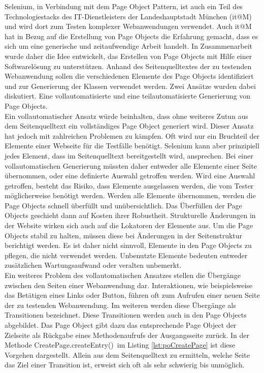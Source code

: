 Selenium, in Verbindung mit dem Page Object Pattern, ist auch ein Teil des Technologiestacks des IT-Dienstleisters der Landeshauptstadt München (it@M) und wird dort zum Testen komplexer Webanwendungen verwendet. Auch it@M hat in Bezug auf die Erstellung von Page Objects die Erfahrung gemacht, dass es sich um eine generische und zeitaufwendige Arbeit handelt.
In Zusammenarbeit wurde daher die Idee entwickelt, das Erstellen von Page Objects mit Hilfe einer Softwarelösung zu unterstützen.
Anhand des Seitenquelltextes der zu testenden Webanwendung sollen die verschiedenen Elemente des Page Objects identifiziert und zur Generierung der Klassen verwendet werden.
Zwei Ansätze wurden dabei diskutiert. Eine vollautomatisierte und eine teilautomatisierte Generierung von Page Objects.\\
Ein vollautomatischer Ansatz würde beinhalten, dass ohne weiteres Zutun aus dem Seitenquelltext ein vollständiges Page Object generiert wird. Dieser Ansatz hat jedoch mit zahlreichen Problemen zu kämpfen. Oft wird nur ein Bruchteil der Elemente einer Webseite für die Testfälle benötigt. Selenium kann aber prinzipiell jedes Element, dass im Seitenquelltext bereitgestellt wird, ansprechen. Bei einer vollautomatischen Generierung müssten daher entweder alle Elemente einer Seite übernommen, oder eine definierte Auswahl getroffen werden.
Wird eine Auswahl getroffen, besteht das Risiko, dass Elemente ausgelassen werden, die vom Tester möglicherweise benötigt werden. Werden alle Elemente übernommen, werden die Page Objects schnell überfüllt und unübersichtlich. Das Überfüllen der Page Objects geschieht dann auf Kosten ihrer Robustheit. Strukturelle Änderungen in der Website wirken sich auch auf die Lokatoren der Elemente aus. Um die Page Objects stabil zu halten, müssen diese bei Änderungen in der Seitenstruktur berichtigt werden.
Es ist daher nicht sinnvoll, Elemente in den Page Objects zu pflegen, die nicht verwendet werden. Unbenutzte Elemente bedeuten entweder zusätzlichen Wartungsaufwand oder veralten unbemerkt.\\
Ein weiteres Problem des vollautomatischen Ansatzes stellen die Übergänge zwischen den Seiten einer Webanwendung dar. Interaktionen, wie beispielsweise das Betätigen eines Links oder Button, führen oft zum Aufrufen einer neuen Seite der zu testenden Webanwendung. Im weiteren werden diese Übergänge als Transitionen bezeichnet. Diese Transitionen werden auch in den Page Objects abgebildet. Das Page Object gibt dazu das entsprechende Page Object der Zielseite als Rückgabe eines Methodenaufrufs der Ausgangsseite zurück. In der Methode \grq CreatePage.createEntry()\grq\ im Listing \ref{lst:poCreatePage} ist diese Vorgehen dargestellt. Allein aus dem Seitenquelltext zu ermitteln, welche Seite das Ziel einer Transition ist, erweist sich oft als sehr schwierig bis unmöglich.\\
